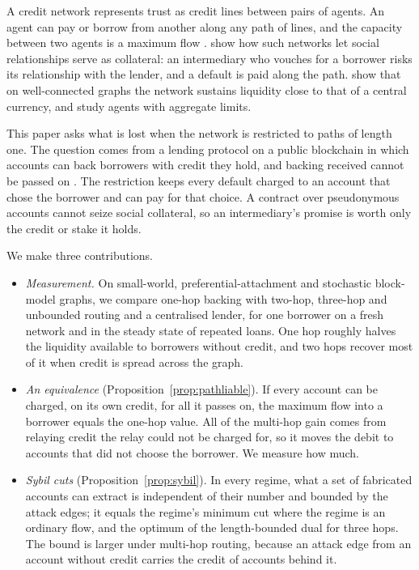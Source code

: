 \documentclass[11pt]{article}
\theoremstyle{plain}
\theoremstyle{definition}
\begin{document}
A credit network represents trust as credit lines between pairs of agents. An agent can pay or
borrow from another along any path of lines, and the capacity between two agents is a maximum flow
\citep{defigueiredo2005trustdavis,ghosh2007trust}. \citet{karlan2009trust} show how such networks
let social relationships serve as collateral: an intermediary who vouches for a borrower risks its
relationship with the lender, and a default is paid along the path. \citet{dandekar2011liquidity}
show that on well-connected graphs the network sustains liquidity close to that of a central
currency, and \citet{ramseyer2020liquidity} study agents with aggregate limits.

This paper asks what is lost when the network is restricted to paths of length one. The question
comes from a lending protocol on a public blockchain in which accounts can back borrowers with credit
they hold, and backing received cannot be passed on \citep{conservedcredit2026}. The restriction
keeps every default charged to an account that chose the borrower and can pay for that choice. A
contract over pseudonymous accounts cannot seize social collateral, so an intermediary's promise is
worth only the credit or stake it holds.

We make three contributions.
\begin{itemize}
\item \emph{Measurement.} On small-world, preferential-attachment and stochastic block-model graphs,
  we compare one-hop backing with two-hop, three-hop and unbounded routing and a centralised lender,
  for one borrower on a fresh network and in the steady state of repeated loans. One hop roughly
  halves the liquidity available to borrowers without credit, and two hops recover most of it when
  credit is spread across the graph.
\item \emph{An equivalence} (Proposition~\ref{prop:pathliable}). If every account can be charged,
  on its own credit, for all it passes on, the maximum flow into a borrower equals the one-hop
  value. All of the multi-hop gain comes from relaying credit the relay could not be charged for, so
  it moves the debit to accounts that did not choose the borrower. We measure how much.
\item \emph{Sybil cuts} (Proposition~\ref{prop:sybil}). In every regime, what a set of fabricated
  accounts can extract is independent of their number and bounded by the attack edges; it equals
  the regime's minimum cut where the regime is an ordinary flow, and the optimum of the
  length-bounded dual for three hops. The bound is larger under multi-hop routing, because an attack
  edge from an account without credit carries the credit of accounts behind it.
\end{itemize}
\end{document}
